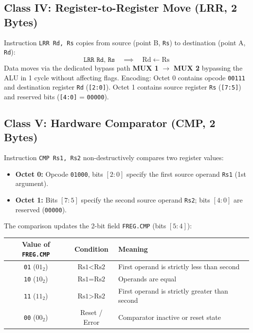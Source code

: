 \documentclass[11pt,a4paper]{article}
\newcommand{\reg}[1]{\texttt{#1}}
\newcommand{\bits}[1]{\texttt{#1}}
\begin{document}
\subsection{Class IV: Register-to-Register Move (LRR, 2 Bytes)}
Instruction \texttt{LRR Rd, Rs} copies from source (point B, \reg{Rs}) to destination (point A, \reg{Rd}):
$$\texttt{LRR Rd, Rs} \quad \implies \quad \text{Rd} \leftarrow \text{Rs}$$
Data moves via the dedicated bypass path \textbf{MUX 1} $\to$ \textbf{MUX 2} bypassing the ALU in 1 cycle without affecting flags. Encoding: Octet 0 contains opcode \bits{00111} and destination register \reg{Rd} (\bits{[2:0]}). Octet 1 contains source register \reg{Rs} (\bits{[7:5]}) and reserved bits (\bits{[4:0]} = \bits{00000}).

\subsection{Class V: Hardware Comparator (CMP, 2 Bytes)}
Instruction \texttt{CMP Rs1, Rs2} non-destructively compares two register values:
\begin{itemize}
  \item \textbf{Octet 0:} Opcode \bits{01000}, bits $[2:0]$ specify the first source operand \reg{Rs1} (1st argument).
  \item \textbf{Octet 1:} Bits $[7:5]$ specify the second source operand \reg{Rs2}; bits $[4:0]$ are reserved (\bits{00000}).
\end{itemize}
The comparison updates the 2-bit field \reg{FREG.CMP} (bits $[5:4]$):
\begin{center}
\begin{tabular}{ccl}
\toprule
Value of \reg{FREG.CMP} & Condition & Meaning \\
\midrule
\texttt{01} ($01_2$) & $\text{Rs1} < \text{Rs2}$ & First operand is strictly less than second \\
\texttt{10} ($10_2$) & $\text{Rs1} = \text{Rs2}$ & Operands are equal \\
\texttt{11} ($11_2$) & $\text{Rs1} > \text{Rs2}$ & First operand is strictly greater than second \\
\texttt{00} ($00_2$) & Reset / Error & Comparator inactive or reset state \\
\bottomrule
\end{tabular}
\end{center}
\end{document}
